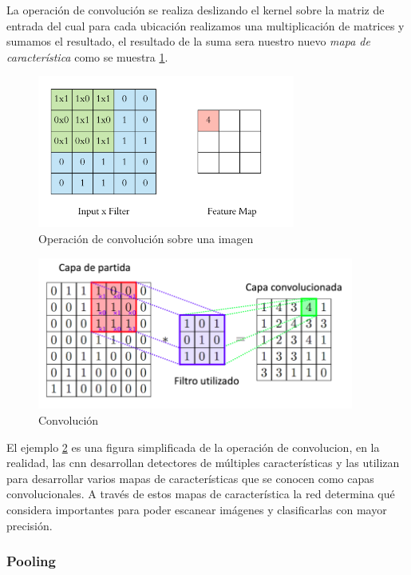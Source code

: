 La operación de convolución se realiza deslizando el kernel sobre la matriz de entrada del cual para cada ubicación realizamos una multiplicación de matrices y sumamos el resultado, el resultado de la suma sera nuestro nuevo \textit{mapa de característica} como se muestra \ref{fig: f_maps2}.

\begin{figure}[H]
 \centering
  \includegraphics[height=5cm,keepaspectratio=true,clip=true]{imagenes/MarcoTeorico/convoluc_2.png}
  \caption{Operación de convolución sobre una imagen}\label{fig: f_maps2} 
\end{figure}


\begin{figure}[H]
 \centering
  \includegraphics[height=5cm,keepaspectratio=true,clip=true]{imagenes/MarcoTeorico/convolucion.png}
  \caption{Convolución} \label{Fig:convolucion}
\end{figure}

El ejemplo \ref{Fig:convolucion} es una figura  simplificada de la operación de convolucion, en la realidad, las \ac{cnn} desarrollan detectores de múltiples características y las utilizan para desarrollar varios mapas de características que se conocen como capas convolucionales. A través de estos mapas de característica la red determina qué  considera importantes para poder escanear imágenes y clasificarlas con mayor precisión.
\subsubsection{Pooling}\label{sub:pooling}

